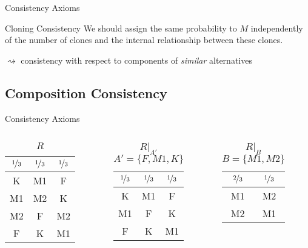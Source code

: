 \documentclass{beamer}
\theoremstyle{definition}
\begin{document}
\begin{frame}{Consistency Axioms}
\begin{block}{Cloning Consistency}
We should assign the same probability to $M$ independently of the number of clones and the internal relationship between these clones.

$\rightsquigarrow$ consistency with respect to components of \emph{similar} alternatives
\end{block}
\end{frame}

\subsection{Composition Consistency}

\begin{frame}{Consistency Axioms}
\begin{columns}
\begin{column}{0.33\textwidth}
\begin{center}\begin{table}\begin{tabular}{ c|c|c } 
 $\nicefrac{1}{3}$ & $\nicefrac{1}{3}$ & $\nicefrac{1}{3}$ \\ 
 \hline\hline
 K & M1 & F \\ 
 M1 & M2 & K \\ 
 M2 & F & M2 \\ 
 F & K & M1 \\
\end{tabular}\caption{$R$}\end{table}\end{center}
\end{column}
\begin{column}{0.33\textwidth}
\begin{center}\begin{table}\begin{tabular}{ c|c|c } 
 $\nicefrac{1}{3}$ & $\nicefrac{1}{3}$ & $\nicefrac{1}{3}$ \\ 
 \hline\hline
 K & M1 & F \\ 
 M1 & F & K \\ 
 F & K & M1 \\
\end{tabular}\caption{$R|_{A'}$ \\ $A' = \{F, M1, K\}$}\end{table}\end{center}
\end{column}
\begin{column}{0.33\textwidth}
\begin{center}\begin{table}\begin{tabular}{ c|c } 
 $\nicefrac{2}{3}$ & $\nicefrac{1}{3}$ \\ 
 \hline\hline
 M1 & M2 \\ 
 M2 & M1 \\ 
\end{tabular}\caption{$R|_B$ \\ $B = \{M1, M2\}$}\end{table}\end{center}
\end{column}
\end{columns}


\end{frame}
\end{document}
